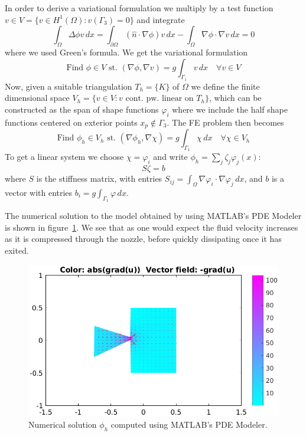 \documentclass{article}
\begin{document}
In order to derive a variational formulation we multiply by
a test function $v \in V = \{v \in H^1(\Omega): v(\Gamma_3) = 0\}$
and integrate
$$ \int_\Omega \Delta\phi v \, dx = \int_{\partial\Omega} (\hat n \cdot \nabla \phi) v \, dx - \int_\Omega \nabla\phi \cdot \nabla v \, dx = 0 $$
where we used Green's formula.
We get the variational formulation
\begin{equation*}
  \text{Find $\phi \in V$ st. } (\nabla\phi, \nabla v) = g \int_{\Gamma_1} v \, dx \quad \forall v \in V
\end{equation*}
Now, given a suitable triangulation $T_h = \{K\}$ of $\Omega$ we define 
the finite dimensional space
$V_h = \{v \in V: \text{$v$ cont. pw. linear on $T_h$}\}$,
which can be constructed as the span of shape functions $\varphi_i$
where we include the half shape functions centered on exterior points
$x_p \notin \Gamma_3$.
The FE problem then becomes
\begin{equation*}
  \text{Find $\phi_h \in V_h$ st. } (\nabla\phi_h, \nabla \chi) = g \int_{\Gamma_1} \chi \, dx \quad \forall \chi \in V_h
\end{equation*}
To get a linear system we choose $\chi = \varphi_i$
and write $\phi_h = \sum_j \zeta_j \varphi_j(x)$:
$$ S \zeta = b $$
where $S$ is the stiffness matrix,
with entries $S_{ij} = \int_\Omega \nabla\varphi_i \cdot \nabla\varphi_j \, dx$,
and $b$ is a vector with entries
$b_i = g \int_{\Gamma_1} \varphi \, dx$.

The numerical solution to the model obtained by using MATLAB's PDE Modeler
is shown in figure~\ref{fig:pde-sol}.
We see that as one would expect the fluid velocity increases
as it is compressed through the nozzle,
before quickly dissipating once it has exited.

\begin{figure}
  \centering
  \includegraphics[width=\textwidth]{pde-sol}
  \caption{Numerical solution $\phi_h$ computed using MATLAB's PDE Modeler. \label{fig:pde-sol}}
\end{figure}
\end{document}
